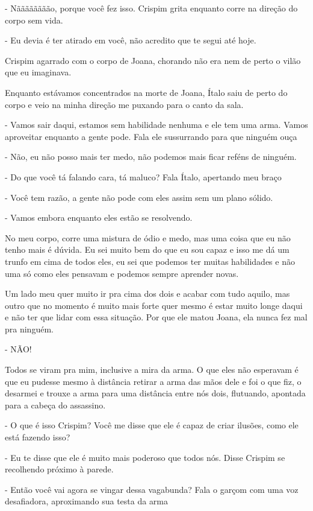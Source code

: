 - Nãããããããão, porque você fez isso. Crispim grita enquanto corre na direção do corpo sem vida.

- Eu devia é ter atirado em você, não acredito que te segui até hoje.

Crispim agarrado com o corpo de Joana, chorando não era nem de perto o vilão que eu imaginava.

Enquanto estávamos concentrados na morte de Joana, Ítalo saiu de perto do corpo e veio na minha direção me puxando para o canto da sala. 

- Vamos sair daqui, estamos sem habilidade nenhuma e ele tem uma arma. Vamos aproveitar enquanto a gente pode. Fala ele sussurrando para que ninguém ouça

- Não, eu não posso mais ter medo, não podemos mais ficar reféns de ninguém. 

- Do que você tá falando cara, tá maluco? Fala Ítalo, apertando meu braço

- Você tem razão, a gente não pode com eles assim sem um plano sólido.

- Vamos embora enquanto eles estão se resolvendo.

No meu corpo, corre uma mistura de ódio e medo, mas uma coisa que eu não tenho mais é dúvida. Eu sei muito bem do que eu sou capaz e isso me dá um trunfo em cima de todos eles, eu sei que podemos ter muitas habilidades e não uma só como eles pensavam e podemos sempre aprender novas.

Um lado meu quer muito ir pra cima dos dois e acabar com tudo aquilo, mas outro que no momento é muito mais forte quer mesmo é estar muito longe daqui e não ter que lidar com essa situação. Por que ele matou Joana, ela nunca fez mal pra ninguém.

- NÃO!

Todos se viram pra mim, inclusive a mira da arma. O que eles não esperavam é que eu pudesse mesmo à distância retirar a arma das mãos dele e foi o que fiz, o desarmei e trouxe a arma para uma distância entre nós dois, flutuando, apontada para a cabeça do assassino.

- O que é isso Crispim? Você me disse que ele é capaz de criar ilusões, como ele está fazendo isso?

- Eu te disse que ele é muito mais poderoso que todos nós. Disse Crispim se recolhendo próximo à parede.

- Então você vai agora se vingar dessa vagabunda? Fala o garçom com uma voz desafiadora, aproximando sua testa da arma

